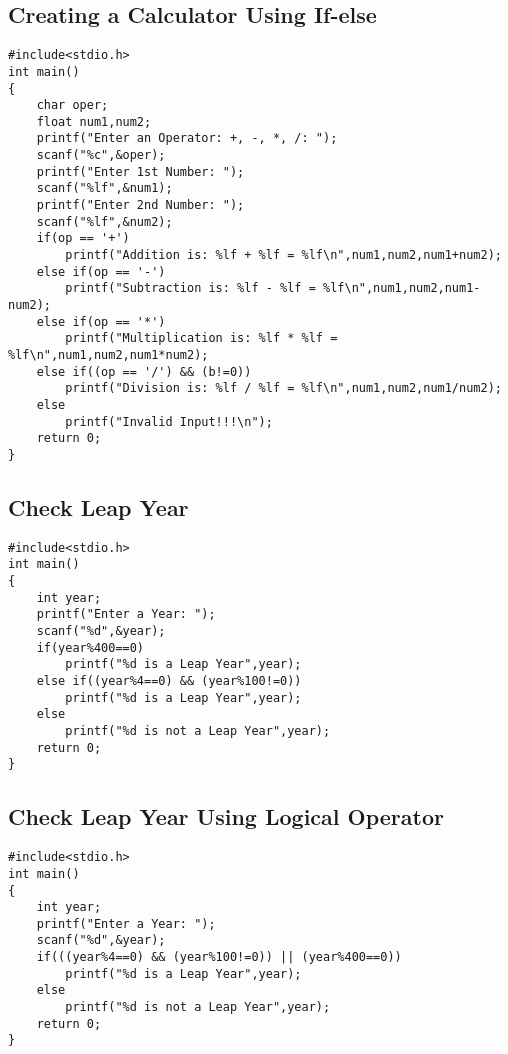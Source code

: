 \documentclass[a4paper,14pt]{article}
\begin{document}
\subsection{Creating a Calculator Using If-else}
\vspace{0.5cm}
\begin{lstlisting}[caption={Creating a Calculator Using If-else}]
#include<stdio.h>
int main()
{
    char oper;
    float num1,num2;
    printf("Enter an Operator: +, -, *, /: ");
    scanf("%c",&oper);
    printf("Enter 1st Number: ");
    scanf("%lf",&num1);
    printf("Enter 2nd Number: ");
    scanf("%lf",&num2);
    if(op == '+')
        printf("Addition is: %lf + %lf = %lf\n",num1,num2,num1+num2);
    else if(op == '-')
        printf("Subtraction is: %lf - %lf = %lf\n",num1,num2,num1-num2);
    else if(op == '*')
        printf("Multiplication is: %lf * %lf = %lf\n",num1,num2,num1*num2);
    else if((op == '/') && (b!=0))
        printf("Division is: %lf / %lf = %lf\n",num1,num2,num1/num2);
    else
        printf("Invalid Input!!!\n");
    return 0;
}
\end{lstlisting}
\newpage

\subsection{Check Leap Year}
\vspace{0.5cm}
\begin{lstlisting}[caption={Check Leap Year}]
#include<stdio.h>
int main()
{
    int year;
    printf("Enter a Year: ");
    scanf("%d",&year);
    if(year%400==0)
        printf("%d is a Leap Year",year);
    else if((year%4==0) && (year%100!=0))
        printf("%d is a Leap Year",year);
    else
        printf("%d is not a Leap Year",year);
    return 0;
}
\end{lstlisting}
\newpage

\subsection{Check Leap Year Using Logical Operator}
\vspace{0.5cm}
\begin{lstlisting}[caption={Check Leap Year Using Logical Operator}]
#include<stdio.h>
int main()
{
    int year;
    printf("Enter a Year: ");
    scanf("%d",&year);
    if(((year%4==0) && (year%100!=0)) || (year%400==0))
        printf("%d is a Leap Year",year);
    else
        printf("%d is not a Leap Year",year);
    return 0;
}
\end{lstlisting}
\newpage
\end{document}
